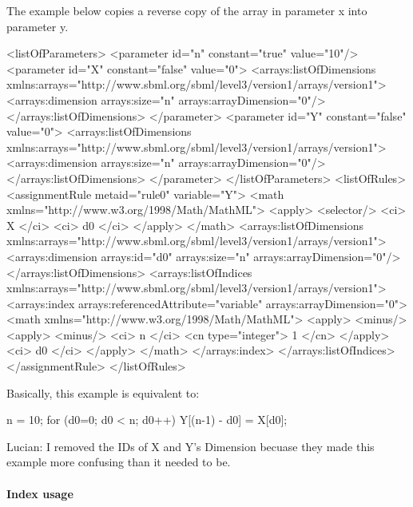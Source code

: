 The example below copies a reverse copy of the array in parameter x into parameter y.

\begin{example}[showstringspaces=false]
<listOfParameters>
  <parameter id="n" constant="true" value="10"/>
  <parameter id="X" constant="false" value="0">
    <arrays:listOfDimensions xmlns:arrays="http://www.sbml.org/sbml/level3/version1/arrays/version1">
      <arrays:dimension arrays:size="n" arrays:arrayDimension="0"/>
    </arrays:listOfDimensions>
  </parameter>
  <parameter id="Y" constant="false" value="0">
    <arrays:listOfDimensions xmlns:arrays="http://www.sbml.org/sbml/level3/version1/arrays/version1">
      <arrays:dimension arrays:size="n" arrays:arrayDimension="0"/>
    </arrays:listOfDimensions>
  </parameter>
</listOfParameters>
<listOfRules>
  <assignmentRule metaid="rule0" variable="Y">
    <math xmlns="http://www.w3.org/1998/Math/MathML">
      <apply>
        <selector/>
        <ci> X </ci>
        <ci> d0 </ci>
      </apply>
    </math>
    <arrays:listOfDimensions xmlns:arrays="http://www.sbml.org/sbml/level3/version1/arrays/version1">
      <arrays:dimension arrays:id="d0" arrays:size="n" arrays:arrayDimension="0"/>
    </arrays:listOfDimensions>
    <arrays:listOfIndices xmlns:arrays="http://www.sbml.org/sbml/level3/version1/arrays/version1">
      <arrays:index arrays:referencedAttribute="variable" arrays:arrayDimension="0">
        <math xmlns="http://www.w3.org/1998/Math/MathML">
          <apply>
            <minus/>
            <apply>
              <minus/>
              <ci> n </ci>
              <cn type="integer"> 1 </cn>
            </apply>
            <ci> d0 </ci>
          </apply>
        </math>
      </arrays:index>
    </arrays:listOfIndices>
  </assignmentRule>
</listOfRules>
\end{example}

Basically, this example is equivalent to:

\begin{example}
n = 10;
for (d0=0; d0 < n; d0++) {
  Y[(n-1) - d0] = X[d0];
}
\end{example}

{\color{red} Lucian: \notice I removed the IDs of X and Y's Dimension becuase they made this example more confusing than it needed to be.}

\paragraph{Index usage}

